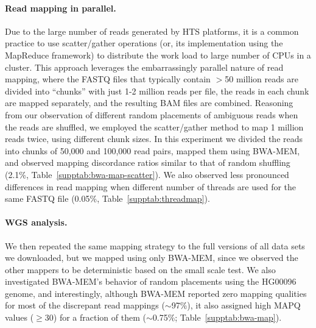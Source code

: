 \documentclass{bioinfo}
\begin{document}
\paragraph{Read mapping in parallel.} Due to the large number of reads generated by HTS platforms, it is a common practice to use scatter/gather operations (or, its implementation using the MapReduce framework)
to distribute the work load to large number of CPUs in a cluster. This approach leverages the embarrassingly parallel nature of read mapping, where the FASTQ files that typically contain $>$50 million reads are
divided into ``chunks'' with just 1-2 million reads per file, the reads in each chunk are mapped separately, and the resulting BAM files are combined. Reasoning from our observation of 
different random placements of ambiguous reads when the reads are shuffled, we employed the scatter/gather method to map 1 million reads twice, using different chunk sizes. In this
experiment we divided the reads into chunks of 50,000 and 100,000 read pairs, mapped them using BWA-MEM, and observed mapping discordance ratios similar to that of random shuffling (2.1\%,  Table~\ref{supptab:bwa-map-scatter}). We also observed less pronounced differences in read mapping when different number of threads are used for the same FASTQ file (0.05\%,  Table~\ref{supptab:threadmap}).

\paragraph{WGS analysis.}
We then repeated the same mapping strategy to the full versions of all data sets we downloaded, but we mapped using only BWA-MEM, since we observed the other mappers to be deterministic
 based on the small scale test.  We also investigated BWA-MEM's behavior of random placements using the
HG00096 genome, and interestingly, although BWA-MEM reported zero mapping qualities for 
most of the discrepant read mappings ($\sim$97\%), it also assigned high MAPQ values ($\geq$30) for a fraction of them  ($\sim$0.75\%;  Table~\ref{supptab:bwa-map}). 
\end{document}
